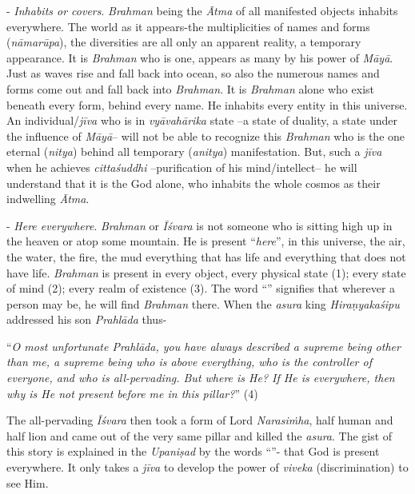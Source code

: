 - \emph{Inhabits or covers}. \emph{Brahman} being the \emph{Ātma} of all manifested objects inhabits everywhere. The world as it appears-the multiplicities of names and forms (\emph{nāmarūpa}), the diversities are all only an apparent reality, a temporary appearance. It is \emph{Brahman} who is one, appears as many by his power of \emph{Māyā}. Just as waves rise and fall back into ocean, so also the numerous names and forms come out and fall back into \emph{Brahman}. It is \emph{Brahman} alone who exist beneath every form, behind every name. He inhabits every entity in this universe. An individual/\emph{jīva} who is in \emph{vyāvahārika} state --a state of duality, a state under the influence of \emph{Māyā}-- will not be able to recognize this \emph{Brahman} who is the one eternal (\emph{nitya}) behind all temporary (\emph{anitya}) manifestation. But, such a \emph{jīva} when he achieves \emph{cittaśuddhi} --purification of his mind/intellect-- he will understand that it is the God alone, who inhabits the whole cosmos as their indwelling \emph{Ātma}.

 - \emph{Here everywhere}. \emph{Brahman} or \emph{Īśvara} is not someone who is sitting high up in the heaven or atop some mountain. He is present ``\emph{here}'', in this universe, the air, the water, the fire, the mud everything that has life and everything that does not have life. \emph{Brahman} is present in every object, every physical state (1); every state of mind (2); every realm of existence (3). The word ``'' signifies that wherever a person may be, he will find \emph{Brahman} there. When the \emph{asura} king \emph{Hiraṇyakaśipu} addressed his son \emph{Prahlāda} thus-

``\emph{O most unfortunate Prahlāda, you have always described a supreme being other than me, a supreme being who is above everything, who is the controller of everyone, and who is all-pervading. But where is He? If He is everywhere, then why is He not present before me in this pillar?}'' (4)

The all-pervading \emph{Īśvara} then took a form of Lord \emph{Narasiṁha}, half human and half lion and came out of the very same pillar and killed the \emph{asura}. The gist of this story is explained in the \emph{Upaniṣad} by the words ``''- that God is present everywhere. It only takes a \emph{jīva} to develop the power of \emph{viveka} (discrimination) to see Him.
\vskip 1.1pt

